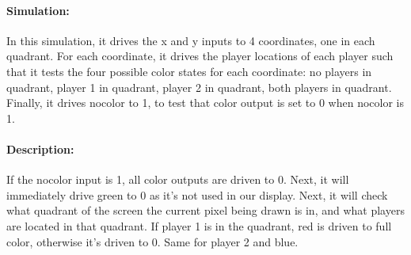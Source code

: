 \documentclass[]{article}
\begin{document}
\paragraph{Simulation:} In this simulation, it drives the x and y inputs to 4 coordinates, one in each quadrant.
For each coordinate, it drives the player locations of each player such that it tests the four possible color states for each coordinate: no players in quadrant,
player 1 in quadrant, player 2 in quadrant, both players in quadrant.  Finally, it drives nocolor to 1, to test that color output is set to 0 when nocolor is 1.
\paragraph{Description:} If the nocolor input is 1, all color outputs are driven to 0.  Next, it will immediately drive green to 0 as it's not used in our display.
Next, it will check what quadrant of the screen the current pixel being drawn is in, and what players are located in that quadrant.
If player 1 is in the quadrant, red is driven to full color, otherwise it's driven to 0.  Same for player 2 and blue.
\end{document}
